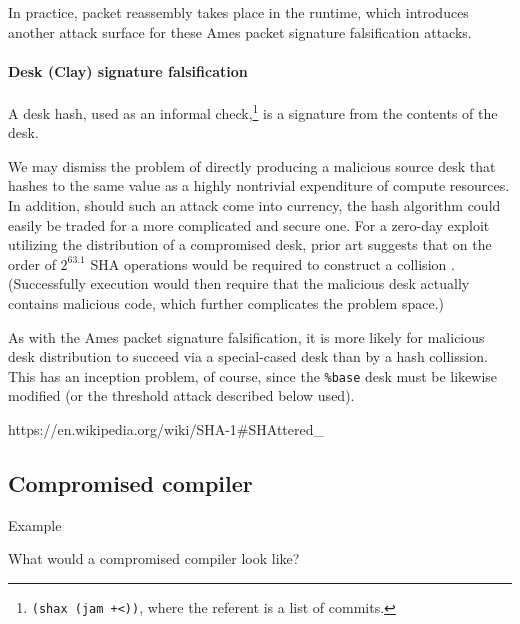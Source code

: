 \documentclass[twoside]{article}
\begin{document}
In practice, packet reassembly takes place in the runtime, which introduces another attack surface for these Ames packet signature falsification attacks.

\paragraph{Desk (Clay) signature falsification}
A desk hash, used as an informal check,\footnote{\lstinline[style=inlinecode]{(shax (jam +<))}, where the referent is a list of commits.} is a signature from the contents of the desk.  

We may dismiss the problem of directly producing a malicious source desk that hashes to the same value as a highly nontrivial expenditure of compute resources.  In addition, should such an attack come into currency, the hash algorithm could easily be traded for a more complicated and secure one.  For a zero-day exploit utilizing the distribution of a compromised desk, prior art suggests that on the order of $2^{63.1}$ SHA operations would be required to construct a collision \citep{Stevens2017}.  (Successfully execution would then require that the malicious desk actually contains malicious code, which further complicates the problem space.)

As with the Ames packet signature falsification, it is more likely for malicious desk distribution to succeed via a special-cased desk than by a hash collission.  This has an inception problem, of course, since the \lstinline[style=inlinecode]{%base} desk must be likewise modified (or the threshold attack described below used).

https://en.wikipedia.org/wiki/SHA-1#SHAttered_%

\subsection{Compromised compiler}

Example

What would a compromised compiler look like?
\end{document}
